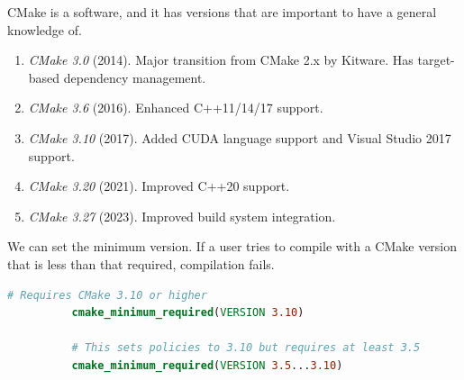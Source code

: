 \documentclass{article}
\newcounter{definition}[section]
\begin{document}
      \begin{definition}[Version]
        \label{def:version}
        CMake is a software, and it has versions that are important to have a general knowledge of. 
        \begin{enumerate}
          \item \textit{CMake 3.0} (2014). Major transition from CMake 2.x by Kitware. Has target-based dependency management. 
          \item \textit{CMake 3.6} (2016). Enhanced C++11/14/17 support. 
          \item \textit{CMake 3.10} (2017). Added CUDA language support and Visual Studio 2017 support. 
          \item \textit{CMake 3.20} (2021). Improved C++20 support. 
          \item \textit{CMake 3.27} (2023). Improved build system integration. 
        \end{enumerate}
        We can set the minimum version. If a user tries to compile with a CMake version that is less than that required, compilation fails. 
        \begin{lstlisting}[language=CMake]
          # Requires CMake 3.10 or higher 
          cmake_minimum_required(VERSION 3.10)  

          # This sets policies to 3.10 but requires at least 3.5
          cmake_minimum_required(VERSION 3.5...3.10)
        \end{lstlisting}
      \end{definition} 
\end{document}
